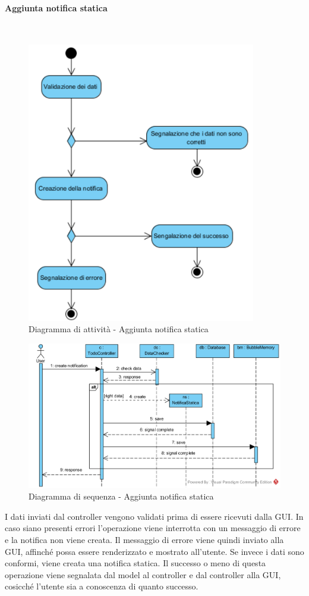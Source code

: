 \paragraph{Aggiunta notifica statica}\mbox{}\\
\nopagebreak
\begin{figure}[H]
	\centering
	\includegraphics[width=10cm]{../../documenti/SpecificaTecnica/diagrammi_img/attivita/addstaticnotification.png}
	\caption{Diagramma di attività - Aggiunta notifica statica}
\end{figure}

\begin{figure}[H]
	\centering
	\includegraphics[width=14cm]{../../documenti/SpecificaTecnica/diagrammi_img/sequenza/todo_aggiungi_notifica.png}
	\caption{Diagramma di sequenza - Aggiunta notifica statica}
\end{figure}
I dati inviati dal controller vengono validati prima di essere ricevuti dalla GUI. In caso siano presenti errori l'operazione viene interrotta con un messaggio di errore e la notifica non viene creata. Il messaggio di errore viene quindi inviato alla GUI, affinché possa essere renderizzato e mostrato all'utente. Se invece i dati sono conformi, viene creata una notifica statica. Il successo o meno di questa operazione viene segnalata dal model al controller e dal controller alla GUI, cosicché l'utente sia a conoscenza di quanto successo.

